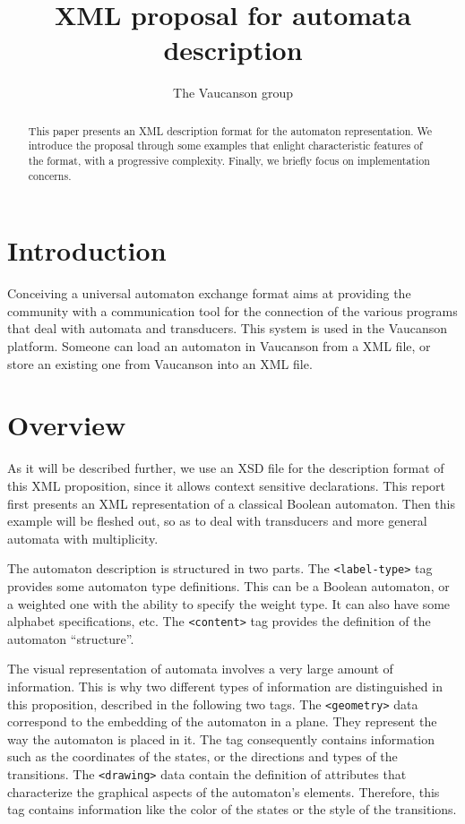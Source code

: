 \documentclass[a4paper]{article}
\newcommand{\Vauc}{{\sc Vaucanson}\xspace}
\newcommand{\xtag}[1]{\texttt{<#1>}}
\def\typetag{\xtag{label-type}}
\def\contenttag{\xtag{content}}
\def\geometrytag{\xtag{geometry}}
\def\drawingtag{\xtag{drawing}}
\begin{document}
\title{XML proposal for automata description}

\author{The \Vauc group}

\maketitle{}

\begin{abstract}
This paper presents an XML description format for the automaton
representation. We introduce the proposal through some examples that
enlight characteristic features of the format, with a progressive
complexity. Finally, we briefly focus on implementation concerns.
\end{abstract}

\section*{Introduction}

Conceiving a universal automaton exchange format aims at providing the
community with a communication tool for the connection
of the various programs that deal with automata and transducers.  This
system is used in the Vaucanson platform. Someone can load an
automaton in Vaucanson from a XML file, or store an existing one from
Vaucanson into an XML file.

\section{Overview}

As it will be described further, we use an XSD file \cite{XSD}
for the description format of this XML proposition, since it allows
context sensitive declarations.  This report first presents an XML
representation of a classical Boolean automaton. Then this example
will be fleshed out, so as to deal with transducers
and more general automata with multiplicity.

The automaton description is structured in two parts.  The
\typetag{} tag provides some automaton type definitions. This can be a
Boolean automaton, or a weighted one with the ability to specify the
weight type.  It can also have some alphabet specifications, etc. The
\contenttag{} tag provides the definition of the automaton
``structure''.

The visual representation of automata involves a very large amount of
information. This is why two different types of information are
distinguished in this proposition, described in the following
two tags.  The \geometrytag{} data correspond to the embedding
of the automaton in a plane. They represent the way the automaton is
placed in it. The tag consequently contains information such as the
coordinates of the states, or the directions and types of the
transitions. The \drawingtag{} data contain the definition of
attributes that characterize the graphical aspects of the automaton's
elements. Therefore, this tag contains information like the color of
the states or the style of the transitions.
\end{document}

